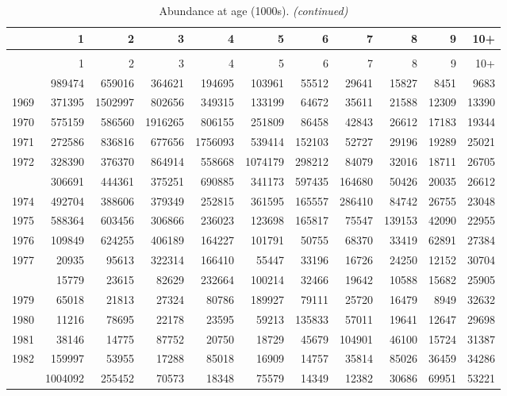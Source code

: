 \documentclass[
]{article}
\begin{document}
\begin{longtable}[t]{lrrrrrrrrrr}
\caption{\label{tab:NAA-table}Abundance at age (1000s).}\\
\toprule
  & 1 & 2 & 3 & 4 & 5 & 6 & 7 & 8 & 9 & 10+\\
\midrule
\endfirsthead
\caption[]{Abundance at age (1000s). \textit{(continued)}}\\
\toprule
  & 1 & 2 & 3 & 4 & 5 & 6 & 7 & 8 & 9 & 10+\\
\midrule
\endhead

\endfoot
\bottomrule
\endlastfoot
1968 & 989474 & 659016 & 364621 & 194695 & 103961 & 55512 & 29641 & 15827 & 8451 & 9683\\
1969 & 371395 & 1502997 & 802656 & 349315 & 133199 & 64672 & 35611 & 21588 & 12309 & 13390\\
1970 & 575159 & 586560 & 1916265 & 806155 & 251809 & 86458 & 42843 & 26612 & 17183 & 19344\\
1971 & 272586 & 836816 & 677656 & 1756093 & 539414 & 152103 & 52727 & 29196 & 19289 & 25021\\
1972 & 328390 & 376370 & 864914 & 558668 & 1074179 & 298212 & 84079 & 32016 & 18711 & 26705\\
\addlinespace
1973 & 306691 & 444361 & 375251 & 690885 & 341173 & 597435 & 164680 & 50426 & 20035 & 26612\\
1974 & 492704 & 388606 & 379349 & 252815 & 361595 & 165557 & 286410 & 84742 & 26755 & 23048\\
1975 & 588364 & 603456 & 306866 & 236023 & 123698 & 165817 & 75547 & 139153 & 42090 & 22955\\
1976 & 109849 & 624255 & 406189 & 164227 & 101791 & 50755 & 68370 & 33419 & 62891 & 27384\\
1977 & 20935 & 95613 & 322314 & 166410 & 55447 & 33196 & 16726 & 24250 & 12152 & 30704\\
\addlinespace
1978 & 15779 & 23615 & 82629 & 232664 & 100214 & 32466 & 19642 & 10588 & 15682 & 25905\\
1979 & 65018 & 21813 & 27324 & 80786 & 189927 & 79111 & 25720 & 16479 & 8949 & 32632\\
1980 & 11216 & 78695 & 22178 & 23595 & 59213 & 135833 & 57011 & 19641 & 12647 & 29698\\
1981 & 38146 & 14775 & 87752 & 20750 & 18729 & 45679 & 104901 & 46100 & 15724 & 31387\\
1982 & 159997 & 53955 & 17288 & 85018 & 16909 & 14757 & 35814 & 85026 & 36459 & 34286\\
\addlinespace
1983 & 1004092 & 255452 & 70573 & 18348 & 75579 & 14349 & 12382 & 30686 & 69951 & 53221\\

\end{longtable}
\end{document}
